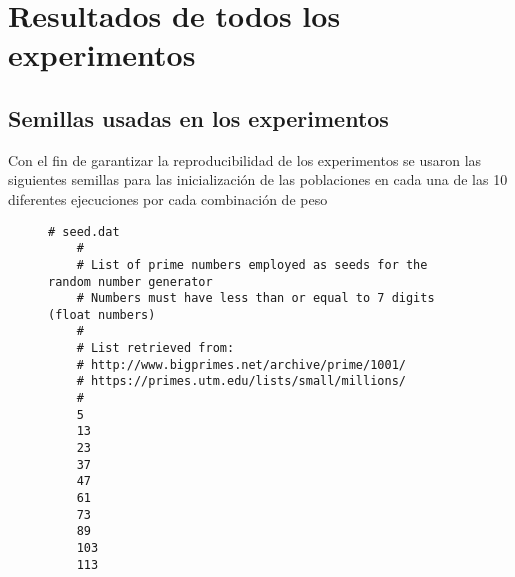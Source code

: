 \chapter{Resultados de todos los experimentos}
\section{Semillas usadas en los experimentos} \label{sec:Apendice_semilla}
Con el fin de garantizar la reproducibilidad de los experimentos se usaron las siguientes semillas para las inicialización de las poblaciones en cada una de las 10 diferentes ejecuciones por cada combinación de peso 

\begin{figure}[H]
\centering
\begin{lstlisting}[caption=inicio del programa seed.dat que contiene a las semillas usadas]
    # seed.dat
    #
    # List of prime numbers employed as seeds for the random number generator
    # Numbers must have less than or equal to 7 digits (float numbers)
    #
    # List retrieved from:
    # http://www.bigprimes.net/archive/prime/1001/
    # https://primes.utm.edu/lists/small/millions/
    #
    5
    13
    23
    37
    47
    61
    73
    89
    103
    113
\end{lstlisting}
\end{figure}



